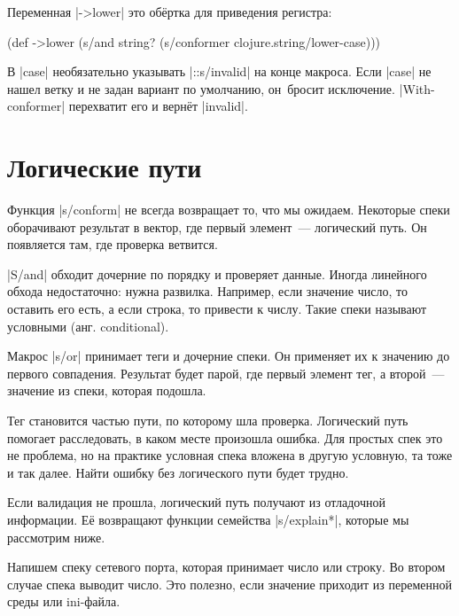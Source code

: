 
\noindent
Переменная \spverb|->lower| это об\"{е}ртка для приведения регистра:

\begin{english}
  \begin{clojure}
(def ->lower
  (s/and
    string?
    (s/conformer clojure.string/lower-case)))
  \end{clojure}
\end{english}

В \spverb|case| необязательно указывать \spverb|::s/invalid| на конце
макроса. Если \spverb|case| не нашел ветку и не задан вариант по умолчанию,
он~бросит исключение. \spverb|With-conformer| перехватит его и верн\"{е}т
\spverb|invalid|.

\section{Логические пути}


Функция \spverb|s/conform| не всегда возвращает то, что мы ожидаем. Некоторые
спеки оборачивают результат в вектор, где первый элемент~--- логический путь. Он
появляется там, где проверка ветвится.

\spverb|S/and| обходит дочерние по порядку и проверяет данные. Иногда линейного
обхода недостаточно: нужна развилка. Например, если значение число, то оставить
его есть, а если строка, то привести к числу. Такие спеки называют условными
(анг. conditional).

Макрос \spverb|s/or| принимает теги и дочерние спеки. Он применяет их к значению
до первого совпадения. Результат будет парой, где первый элемент тег, а
второй~--- значение из спеки, которая подошла.

Тег становится частью пути, по которому шла проверка. Логический путь помогает
расследовать, в каком месте произошла ошибка. Для простых спек это не проблема,
но на практике условная спека вложена в другую условную, та тоже и так
далее. Найти ошибку без логического пути будет трудно.


Если валидация не прошла, логический путь получают из отладочной информации. Е\"{е}
возвращают функции семейства \spverb|s/explain*|, которые мы рассмотрим ниже.

Напишем спеку сетевого порта, которая принимает число или строку. Во втором
случае спека выводит число. Это полезно, если значение приходит из переменной
среды или ini-файла.

